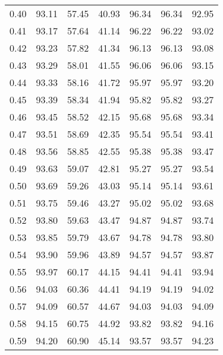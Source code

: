 \begin{tabular}{|c|c|c|c|c|c|c|}
      0.40 &     93.11 &     57.45 &      40.93 &   96.34 &      96.34 &         92.95 \\
      0.41 &     93.17 &     57.64 &      41.14 &   96.22 &      96.22 &         93.02 \\
      0.42 &     93.23 &     57.82 &      41.34 &   96.13 &      96.13 &         93.08 \\
      0.43 &     93.29 &     58.01 &      41.55 &   96.06 &      96.06 &         93.15 \\
      0.44 &     93.33 &     58.16 &      41.72 &   95.97 &      95.97 &         93.20 \\
      0.45 &     93.39 &     58.34 &      41.94 &   95.82 &      95.82 &         93.27 \\
      0.46 &     93.45 &     58.52 &      42.15 &   95.68 &      95.68 &         93.34 \\
      0.47 &     93.51 &     58.69 &      42.35 &   95.54 &      95.54 &         93.41 \\
      0.48 &     93.56 &     58.85 &      42.55 &   95.38 &      95.38 &         93.47 \\
      0.49 &     93.63 &     59.07 &      42.81 &   95.27 &      95.27 &         93.54 \\
      0.50 &     93.69 &     59.26 &      43.03 &   95.14 &      95.14 &         93.61 \\
      0.51 &     93.75 &     59.46 &      43.27 &   95.02 &      95.02 &         93.68 \\
      0.52 &     93.80 &     59.63 &      43.47 &   94.87 &      94.87 &         93.74 \\
      0.53 &     93.85 &     59.79 &      43.67 &   94.78 &      94.78 &         93.80 \\
      0.54 &     93.90 &     59.96 &      43.89 &   94.57 &      94.57 &         93.87 \\
      0.55 &     93.97 &     60.17 &      44.15 &   94.41 &      94.41 &         93.94 \\
      0.56 &     94.03 &     60.36 &      44.41 &   94.19 &      94.19 &         94.02 \\
      0.57 &     94.09 &     60.57 &      44.67 &   94.03 &      94.03 &         94.09 \\
      0.58 &     94.15 &     60.75 &      44.92 &   93.82 &      93.82 &         94.16 \\
      0.59 &     94.20 &     60.90 &      45.14 &   93.57 &      93.57 &         94.23 \\

\end{tabular}
